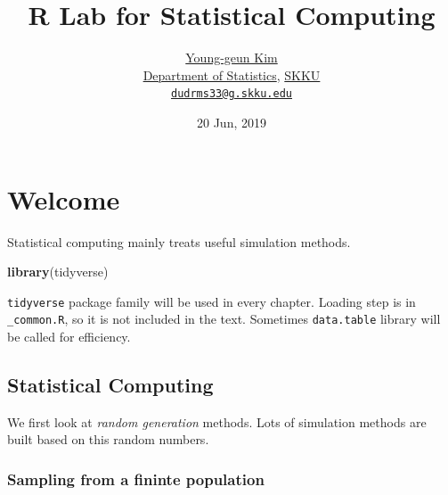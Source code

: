 \documentclass[]{book}
\title{R Lab for Statistical Computing}
\author{\href{https://github.com/ygeunkim}{Young-geun Kim}\\
\href{https://stat.skku.edu/stat/index.jsp}{Department of Statistics}, \href{https://www.skku.edu/skku/index.do}{SKKU}\\
\href{mailto:dudrms33@g.skku.edu}{\nolinkurl{dudrms33@g.skku.edu}}}
\date{20 Jun, 2019}
\newenvironment{Shaded}{\begin{snugshade}}{\end{snugshade}}
\newcommand{\KeywordTok}[1]{\textcolor[rgb]{0.13,0.29,0.53}{\textbf{#1}}}
\newcommand{\NormalTok}[1]{#1}
\let\oldmaketitle\maketitle
\theoremstyle{definition}
\theoremstyle{definition}
\theoremstyle{definition}
\theoremstyle{remark}
\begin{document}
\maketitle

\begin{titlepage}
  
\end{titlepage}

\let\maketitle\oldmaketitle
\maketitle

{
\setcounter{tocdepth}{1}
\tableofcontents
}
\hypertarget{welcome}{%
\chapter*{Welcome}\label{welcome}}

Statistical computing mainly treats useful simulation methods.

\begin{Shaded}
\begin{Highlighting}[]
\KeywordTok{library}\NormalTok{(tidyverse)}
\end{Highlighting}
\end{Shaded}

\texttt{tidyverse} package family will be used in every chapter. Loading step is in \texttt{\_common.R}, so it is not included in the text. Sometimes \texttt{data.table} library will be called for efficiency.

\hypertarget{statistical-computing}{%
\section*{Statistical Computing}\label{statistical-computing}}

We first look at \emph{random generation} methods. Lots of simulation methods are built based on this random numbers.

\hypertarget{sampling-from-a-fininte-population}{%
\subsection*{Sampling from a fininte population}\label{sampling-from-a-fininte-population}}
\end{document}
